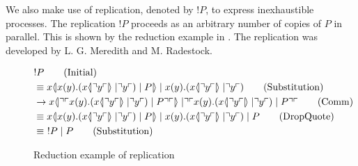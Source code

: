 We also make use of replication, denoted by $!P$, to express inexhaustible processes.
The replication $!P$ proceeds as an arbitrary number of copies of $P$ in parallel. This is shown by the reduction example in . The replication was developed by L. G. Meredith and M. Radestock\citep{Meredith2005}.





\begin{figure}[h]
    \begin{align}
        &!P \tag{Initial} \\
        &\equiv \lift{x}{\inp{x}{y}(\lift{x}{\drop{y}}\para\drop{y})\para P}\para\inp{x}{y}(\lift{x}{\drop{y}}\para \drop{y}) \tag{Substitution} \\
        &\ra \lift{x}{\drop{\quot{\inp{x}{y}(\lift{x}{\drop{y}}\para\drop{y})\para P}}}\para\drop{\quot{\inp{x}{y}(\lift{x}{\drop{y}}\para\drop{y})\para P}} \tag{Comm}\\
        &\equiv \lift{x}{\inp{x}{y}(\lift{x}{\drop{y}}\para\drop{y})\para P}\para\inp{x}{y}(\lift{x}{\drop{y}}\para \drop{y})\para P \tag{DropQuote} \\
        &\equiv\ 
        !P\para P \tag{Substitution}
    \end{align}
    \caption{Reduction example of replication}
    \label{fig:reductionexample}
\end{figure}

\FloatBarrier